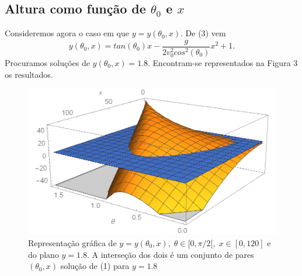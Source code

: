 \documentclass[aps,pre,twocolumn,showpacs,amsmath,amssymb]{revtex4-1}
\begin{document}
\subsection{Altura como função de $\theta_0$ e $x$}
Consideremos agora o caso em que $y=y(\theta_0,x)$.
De (3) vem
\begin{equation}
  y(\theta_0,x)=tan(\theta_{0})x-\frac{g}{2v_{0}^{2}cos^2(\theta_{0})}x^2 + 1.
\end{equation}
Procuramos soluções de $y(\theta_0,x)=1.8$.
Encontram-se representados na Figura 3 os resultados.
\begin{figure} [h]
  \includegraphics[scale=0.28]{parte3Alineab.png}
  \caption{Representação gráfica de $y=y(\theta_0,x),\;\theta \in [0,\pi/2[,\;x \in [0,120]$ e do plano $y=1.8$. A interseção dos dois é um conjunto de pares $(\theta_0,x)$ solução de (1) para $y=1.8$}
  \label{}
\end{figure}
\end{document}
